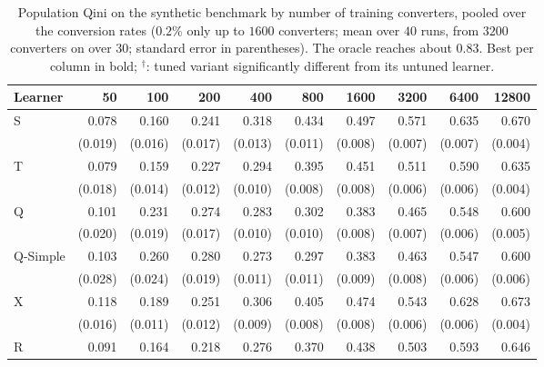 \documentclass{article}
\begin{document}
\begin{table}[H]
\centering
\caption{Population Qini on the synthetic benchmark by number of training
converters, pooled over the conversion rates ($0.2\%$ only up to $1600$
converters; mean over $40$ runs, from $3200$ converters on over $30$; standard
error in parentheses). The oracle reaches about $0.83$. Best per column in
bold; $^\dagger$: tuned variant significantly different from its untuned
learner.}
\label{tab:app-syn-qini}
\footnotesize
\setlength{\tabcolsep}{3pt}
\begin{tabular}{l|rrrrrrrrr}
\hline
Learner & 50 & 100 & 200 & 400 & 800 & 1600 & 3200 & 6400 & 12800 \\
\hline
S & 0.078 & 0.160 & 0.241 & 0.318 & 0.434 & 0.497 & 0.571 & 0.635 & 0.670 \\
 & \scriptsize (0.019) & \scriptsize (0.016) & \scriptsize (0.017) & \scriptsize (0.013) & \scriptsize (0.011) & \scriptsize (0.008) & \scriptsize (0.007) & \scriptsize (0.007) & \scriptsize (0.004) \\[2pt]
T & 0.079 & 0.159 & 0.227 & 0.294 & 0.395 & 0.451 & 0.511 & 0.590 & 0.635 \\
 & \scriptsize (0.018) & \scriptsize (0.014) & \scriptsize (0.012) & \scriptsize (0.010) & \scriptsize (0.008) & \scriptsize (0.008) & \scriptsize (0.006) & \scriptsize (0.006) & \scriptsize (0.004) \\[2pt]
\hline
Q & 0.101 & 0.231 & 0.274 & 0.283 & 0.302 & 0.383 & 0.465 & 0.548 & 0.600 \\
 & \scriptsize (0.020) & \scriptsize (0.019) & \scriptsize (0.017) & \scriptsize (0.010) & \scriptsize (0.010) & \scriptsize (0.008) & \scriptsize (0.007) & \scriptsize (0.006) & \scriptsize (0.005) \\[2pt]
Q-Simple & 0.103 & 0.260 & 0.280 & 0.273 & 0.297 & 0.383 & 0.463 & 0.547 & 0.600 \\
 & \scriptsize (0.028) & \scriptsize (0.024) & \scriptsize (0.019) & \scriptsize (0.011) & \scriptsize (0.011) & \scriptsize (0.009) & \scriptsize (0.008) & \scriptsize (0.006) & \scriptsize (0.006) \\[2pt]
\hline
X & 0.118 & 0.189 & 0.251 & 0.306 & 0.405 & 0.474 & 0.543 & 0.628 & 0.673 \\
 & \scriptsize (0.016) & \scriptsize (0.011) & \scriptsize (0.012) & \scriptsize (0.009) & \scriptsize (0.008) & \scriptsize (0.008) & \scriptsize (0.006) & \scriptsize (0.006) & \scriptsize (0.004) \\[2pt]
R & 0.091 & 0.164 & 0.218 & 0.276 & 0.370 & 0.438 & 0.503 & 0.593 & 0.646 \\

\end{tabular}
\end{table}
\end{document}
